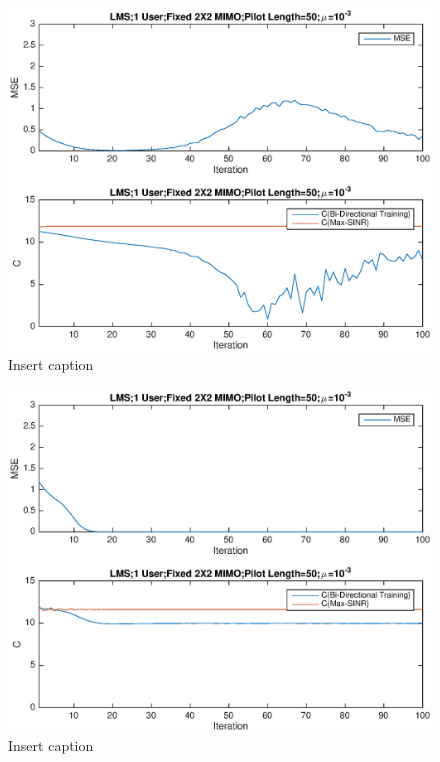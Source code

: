 \documentclass[11pt, oneside]{article}   	%
\begin{document}
\begin{figure}[bp!]
    \centering
    \centerline{\includegraphics[width=220mm]{LMS1}}
    \caption{Insert caption}
\end{figure} 

\begin{figure}[bp!]
    \centering
    \centerline{\includegraphics[width=220mm]{LMS2}}
    \caption{Insert caption}
\end{figure} 
\end{document}
